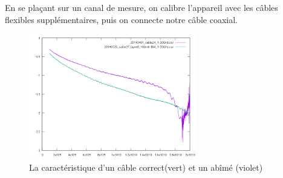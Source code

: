En se plaçant sur un canal de mesure, on calibre l'appareil avec les câbles flexibles supplémentaires, puis on connecte notre câble coaxial.

\begin{figure}
    \begin{center}
        \includegraphics[width=0.65\textwidth]{Images/Caracs/abime2.png}
        \caption{La caractéristique d'un câble correct(vert) et un abîmé (violet)}
        \label{Carac1}
    \end{center}
\end{figure}
